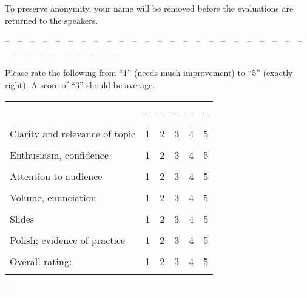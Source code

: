 \documentclass[letterpaper, 11pt]{article} %
\begin{document}
\pagestyle{empty}


\underline{\hspace{3in}}

\vspace{.25in}
\noindent To preserve anonymity, your name will be removed before 
the evaluations are returned to the speakers.

\vspace{.25in}
--\ \ --\ \ --\ \ --\ \ --\ \ --\ \ --\ \ --\ \ --\ \ --\ \ --\ \ --\ \ --\ \ --\ \ --\ \ --\ \ --\ \ --\ \ --\ \ --\ \ --\ \ --\ \ --\ \ --\ \ --\ \ --\ \ --\ \ --\ \ --\ \ --\ \ --\ \ --\ \ --\ \ 


\vspace{.4in}

\underline{\hspace{3in}}

\bigskip
\noindent Please rate the following from ``1'' (needs much improvement) to 
``5'' (exactly right).
A score of ``3'' should be average.

\begin{center}
\begin{tabular}{p{2in}ccccc}
& \rule{.5in}{-.1in} & \rule{.5in}{-.1in}   & \rule{.5in}{-.1in}   & \rule{.5in}{-.1in}   & \rule{.5in}{-.1in}  \\
\hfill Clarity and relevance of topic & 1 & 2 & 3 & 4 & 5\\
&&&&&\\
\hfill Enthusiasm, confidence & 1 & 2 & 3 & 4 & 5\\
&&&&&\\
\hfill Attention to audience & 1 & 2 & 3 & 4 & 5\\
&&&&&\\
\hfill Volume, enunciation & 1 & 2 & 3 & 4 & 5\\
&&&&&\\
\hfill Slides & 1 & 2 & 3 & 4 & 5\\
&&&&&\\
\hfill Polish; evidence of practice & 1 & 2 & 3 & 4 & 5\\
&&&&&\\
\hfill Overall rating: & 1 & 2 & 3 & 4 & 5\\
&&&&&\\
\end{tabular}
\end{center}

\begin{center}
\begin{tabular}{p{5.5in}}
\rule{0in}{2em}\\\hline
\rule{0in}{2em}\\\hline
\rule{0in}{2em}\\\hline
\end{tabular}
\end{center}
\end{document}
